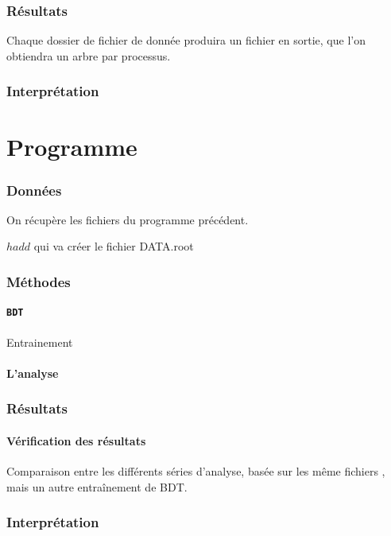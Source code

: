 \subsubsection{Résultats}

Chaque dossier de fichier de donnée \SLCIO produira un fichier \ROOT en sortie, \cad que l'on obtiendra un arbre \ROOT par processus.


\subsubsection{Interprétation}

\section{Programme \analysis}

\subsubsection{Données}

On récupère les fichiers \ROOT du programme \processor précédent. 

$ hadd $ qui va créer le fichier DATA.root

\subsubsection{Méthodes}

\paragraph{\texttt{BDT}}

Entrainement

\paragraph{L'analyse}



\subsubsection{Résultats}

\paragraph{Vérification des résultats}
Comparaison entre les différents séries d'analyse, basée sur les même fichiers \ROOT, mais un autre entraînement de BDT.

\subsubsection{Interprétation}
